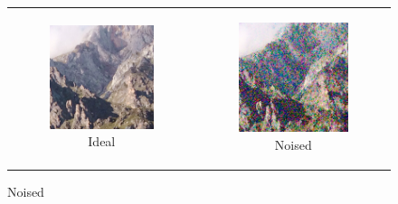 \begin{figure}
  \centering
  \begin{tabular}{cc}
    \begin{subfigure}{0.3\textwidth}
      \includegraphics[width=\linewidth]{inc/research/complex/original.png}
      \caption{Ideal}
    \end{subfigure} &
    \begin{subfigure}{0.3\textwidth}
      \includegraphics[width=\linewidth]{inc/research/complex/noised.png}
      \caption{Noised}
    \end{subfigure} \\
    

\end{tabular}
\end{figure}
